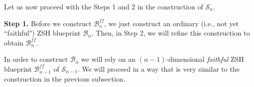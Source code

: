 \documentclass[12pt,letterpaper]{article}
\renewcommand{\S}{\mathcal{S}}
\newcommand{\B}{\mathcal{B}}
\newcommand{\eps}{\varepsilon}
\newcommand{\nbhd}{\mathit{nbhd}}
\renewcommand{\a}{\alpha}
\begin{document}
%
%







\bigskip


\bigskip

\noindent
Let us now proceed with the Steps 1 and 2 in the construction of $\S_n$.



\bigskip



\noindent
{\bf Step 1.} 
Before we construct $\B_n^\mathit{ff}$, we just construct  an ordinary (i.e., not yet ``faithful") ZSH blueprint $\B_n$. Then, in Step 2, we will  refine this construction to obtain $\B_n^\mathit{ff}$. 
 
In order to construct $\B_n$ we will rely on 
an $(n-1)$-dimensional {\em faithful} ZSH blueprint $\B_{n-1}^\mathit{ff}$ of $\S_{n-1}$. We will proceed in a way that is very similar to the construction in the previous subsection. 
\end{document}
